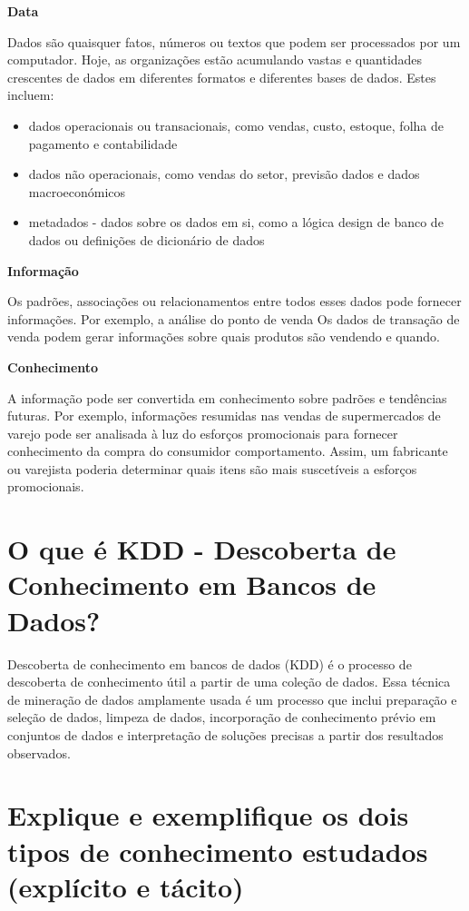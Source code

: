 \noindent \textbf{Data}

Dados são quaisquer fatos, números ou textos que podem ser processados por um computador. Hoje, as organizações estão acumulando vastas e
quantidades crescentes de dados em diferentes formatos e diferentes
bases de dados. Estes incluem: 
\begin{itemize}
    \item dados operacionais ou transacionais, como vendas, custo,
estoque, folha de pagamento e contabilidade
    \item dados não operacionais, como vendas do setor, previsão
dados e dados macroeconómicos
    \item metadados - dados sobre os dados em si, como a lógica
design de banco de dados ou definições de dicionário de dados
\end{itemize}

\noindent \textbf{Informação}

Os padrões, associações ou relacionamentos entre todos esses dados
pode fornecer informações. Por exemplo, a análise do ponto de venda
Os dados de transação de venda podem gerar informações sobre quais produtos são vendendo e quando.

\noindent \textbf{Conhecimento}

A informação pode ser convertida em conhecimento sobre padrões e tendências futuras. 
Por exemplo, informações resumidas nas vendas de supermercados de varejo pode ser analisada à luz do esforços promocionais para fornecer conhecimento da compra do consumidor comportamento. 
Assim, um fabricante ou varejista poderia determinar quais itens são mais suscetíveis a esforços promocionais. 
\cite{ReviewlArticle}

\section{O que é KDD - Descoberta de Conhecimento em Bancos de Dados?}

Descoberta de conhecimento em bancos de dados (KDD) é o processo de descoberta de conhecimento útil a partir de uma coleção de dados. Essa técnica de mineração de dados amplamente usada é um processo que inclui preparação e seleção de dados, limpeza de dados, incorporação de conhecimento prévio em conjuntos de dados e interpretação de soluções precisas a partir dos resultados observados.
\cite{Techopedia}

\section{Explique e exemplifique os dois tipos de conhecimento estudados (explícito e tácito)}

